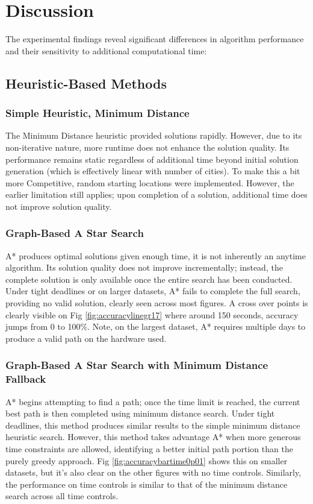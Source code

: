 \documentclass[11pt]{article}
\begin{document}
	
	\section{Discussion}
	The experimental findings reveal significant differences in algorithm performance and their sensitivity to additional computational time:
	
	\subsection{Heuristic-Based Methods}	
	\subsubsection{Simple Heuristic, Minimum Distance}
	The Minimum Distance heuristic provided solutions rapidly. However, due to its non-iterative nature, more runtime does not enhance the solution quality. Its performance remains static regardless of additional time beyond initial solution generation (which is effectively linear with number of cities). To make this a bit more Competitive, random starting locations were implemented. However, the earlier limitation still applies; upon completion of a solution, additional time does not improve solution quality.
	
	\subsubsection{Graph-Based A Star Search}
	A* produces optimal solutions given enough time, it is not inherently an anytime algorithm. Its solution quality does not improve incrementally; instead, the complete solution is only available once the entire search has been conducted. 
	Under tight deadlines or on larger datasets, A* fails to complete the full search, providing no valid solution, clearly seen across most figures. A cross over points is clearly visible on Fig \ref{fig:accuracylinegr17} where around 150 seconds, accuracy jumps from 0 to 100\%. Note, on the largest dataset, A* requires multiple days to produce a valid path on the hardware used.
	
	\subsubsection{Graph-Based A Star Search with Minimum Distance Fallback}
	A* begins attempting to find a path; once the time limit is reached, the current best path is then completed using minimum distance search. Under tight deadlines, this method produces similar results to the simple minimum distance heuristic search. However, this method takes advantage A* when more generous time constraints are allowed, identifying a better initial path portion than the purely greedy approach. Fig \ref{fig:accuracybartime0p01} shows this on smaller datasets, but it's also clear on the other figures with no time controls. Similarly, the performance on time controls is similar to that of the minimum distance search across all time controls. 
	
\end{document}
